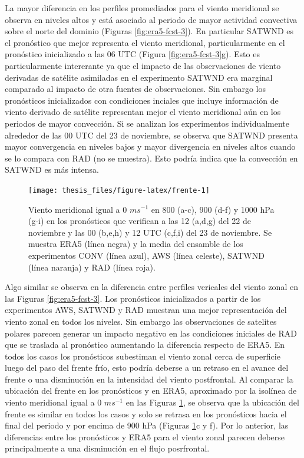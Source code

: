 \documentclass[12pt,oneside,a4paper]{reedthesis}
\begin{document}
La mayor diferencia en los perfiles promediados para el viento meridional se observa en niveles altos y está asociado al periodo de mayor actividad convectiva sobre el norte del dominio (Figuras \ref{fig:era5-fcst-3}). En particular SATWND es el pronóstico que mejor representa el viento meridional, particularmente en el pronóstico inicializado a las 06 UTC (Figura \ref{fig:era5-fcst-3}g). Esto es particularmente intererante ya que el impacto de las observaciones de viento derivadas de satélite asimiladas en el experimento SATWND era marginal comparado al impacto de otra fuentes de observaciones. Sin embargo los pronósticos inicializados con condiciones inciales que incluye información de viento derivado de satélite representan mejor el viento meridional aún en los periodos de mayor convección. Si se analizan los experimentos individualmente alrededor de las 00 UTC del 23 de noviembre, se observa que SATWND presenta mayor convergencia en niveles bajos y mayor divergencia en niveles altos cuando se lo compara con RAD (no se muestra). Esto podría indica que la convección en SATWND es más intensa.


\begin{figure}
\texttt{[image: thesis\_files/figure-latex/frente-1]} \caption{Viento meridional igual a 0 \(ms^{-1}\) en 800 (a-c), 900 (d-f) y 1000 hPa (g-i) en los pronósticos que verifican a las 12 (a,d,g) del 22 de noviembre y las 00 (b,e,h) y 12 UTC (c,f,i) del 23 de noviembre. Se muestra ERA5 (línea negra) y la media del ensamble de los experimentos CONV (línea azul), AWS (línea celeste), SATWND (línea naranja) y RAD (línea roja).}\label{fig:frente}
\end{figure}
Algo similar se observa en la diferencia entre perfiles vericales del viento zonal en las Figuras \ref{fig:era5-fcst-3}. Los pronósticos inicializados a partir de los experimentos AWS, SATWND y RAD muestran una mejor representación del viento zonal en todos los niveles. Sin embargo las observaciones de satelites polares parecen generar un impacto negativo en las condiciones iniciales de RAD que se traslada al pronóstico aumentando la diferencia respecto de ERA5. En todos los casos los pronósticos subestiman el viento zonal cerca de superficie luego del paso del frente frío, esto podría deberse a un retraso en el avance del frente o una disminución en la intensidad del viento postfrontal. Al comparar la ubicación del frente en los pronósticos y en ERA5, aproximado por la isolínea de viento meridional igual a 0 \(ms^{-1}\) en las Figuras \ref{fig:frente}, se observa que la ubicación del frente es similar en todos los casos y solo se retrasa en los pronósticos hacia el final del periodo y por encima de 900 hPa (Figuras \ref{fig:frente}c y f). Por lo anterior, las diferencias entre los pronósticos y ERA5 para el viento zonal parecen deberse principalmente a una disminución en el flujo posrfrontal.
\end{document}

